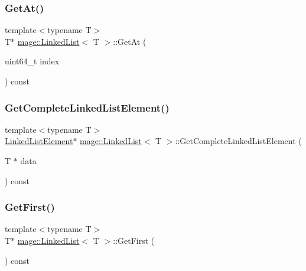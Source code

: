 \hypertarget{classmage_1_1_linked_list_a97922b200a12979e5c8692dd5f3f73d1}{}\label{classmage_1_1_linked_list_a97922b200a12979e5c8692dd5f3f73d1} 
\subsubsection{\texorpdfstring{Get\+At()}{GetAt()}}
{\footnotesize\ttfamily template$<$typename T$>$ \\
T$\ast$ \hyperlink{classmage_1_1_linked_list}{mage\+::\+Linked\+List}$<$ T $>$\+::Get\+At (\begin{DoxyParamCaption}\item[{uint64\+\_\+t}]{index }\end{DoxyParamCaption}) const}

\hypertarget{classmage_1_1_linked_list_a0da4ff247abafd3a496b379673c111c1}{}\label{classmage_1_1_linked_list_a0da4ff247abafd3a496b379673c111c1} 
\subsubsection{\texorpdfstring{Get\+Complete\+Linked\+List\+Element()}{GetCompleteLinkedListElement()}}
{\footnotesize\ttfamily template$<$typename T$>$ \\
\hyperlink{structmage_1_1_linked_list_1_1_linked_list_element}{Linked\+List\+Element}$\ast$ \hyperlink{classmage_1_1_linked_list}{mage\+::\+Linked\+List}$<$ T $>$\+::Get\+Complete\+Linked\+List\+Element (\begin{DoxyParamCaption}\item[{T $\ast$}]{data }\end{DoxyParamCaption}) const}

\hypertarget{classmage_1_1_linked_list_a8394fd1c390b806b9daafdff497b02fb}{}\label{classmage_1_1_linked_list_a8394fd1c390b806b9daafdff497b02fb} 
\subsubsection{\texorpdfstring{Get\+First()}{GetFirst()}}
{\footnotesize\ttfamily template$<$typename T$>$ \\
T$\ast$ \hyperlink{classmage_1_1_linked_list}{mage\+::\+Linked\+List}$<$ T $>$\+::Get\+First (\begin{DoxyParamCaption}{ }\end{DoxyParamCaption}) const}

